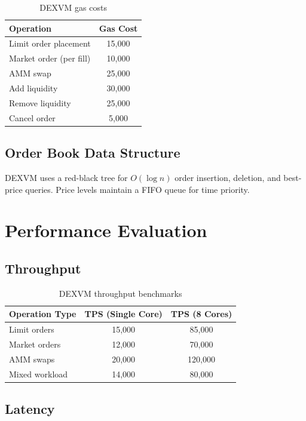 \documentclass[11pt,a4paper]{article}
\theoremstyle{definition}
\begin{document}
\begin{table}[h]
\centering
\begin{tabular}{@{}lc@{}}
\toprule
Operation & Gas Cost \\
\midrule
Limit order placement & 15,000 \\
Market order (per fill) & 10,000 \\
AMM swap & 25,000 \\
Add liquidity & 30,000 \\
Remove liquidity & 25,000 \\
Cancel order & 5,000 \\
\bottomrule
\end{tabular}
\caption{DEXVM gas costs}
\end{table}

\subsection{Order Book Data Structure}

DEXVM uses a red-black tree for $O(\log n)$ order insertion, deletion, and best-price queries. Price levels maintain a FIFO queue for time priority.

\section{Performance Evaluation}

\subsection{Throughput}

\begin{table}[h]
\centering
\begin{tabular}{@{}lcc@{}}
\toprule
Operation Type & TPS (Single Core) & TPS (8 Cores) \\
\midrule
Limit orders & 15,000 & 85,000 \\
Market orders & 12,000 & 70,000 \\
AMM swaps & 20,000 & 120,000 \\
Mixed workload & 14,000 & 80,000 \\
\bottomrule
\end{tabular}
\caption{DEXVM throughput benchmarks}
\end{table}

\subsection{Latency}
\end{document}
